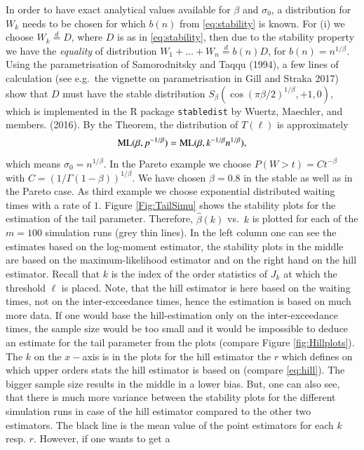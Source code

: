 \documentclass[]{elsarticle} %
\begin{document}
In order to have exact analytical values available for \(\beta\) and
\(\sigma_0\), a distribution for \(W_k\) needs to be chosen for which
\(b(n)\) from \eqref{eq:stability} is known. For (i) we choose
\(W_k \stackrel{d}{=} D\), where \(D\) is as in \eqref{eq:stability},
then due to the stability property we have the \emph{equality} of
distribution \(W_1 + \ldots + W_n \stackrel{d}{=} b(n) D\), for
\(b(n) = n^{1/\beta}\). Using the parametrisation of Samorodnitsky and
Taqqu (1994), a few lines of calculation (see e.g.~the vignette on
parametrisation in Gill and Straka 2017) show that \(D\) must have the
stable distribution \(S_\beta(\cos(\pi \beta/2)^{1/\beta}, +1, 0)\),
which is implemented in the R package \texttt{stabledist} by Wuertz,
Maechler, and members. (2016). By the Theorem, the distribution of
\(T(\ell)\) is approximately \[
{\rm ML}(\beta, p^{-1/\beta}) 
= {\rm ML}(\beta, k^{-1/\beta} n^{1/\beta}),
\] which means \(\sigma_0 = n^{1/\beta}\). In the Pareto example we
choose \(P(W>t)=Ct^{-\beta}\) with \(C=(1/\Gamma(1-\beta))^{1/\beta}\).
We have chosen \(\beta=0.8\) in the stable as well as in the Pareto
case. As third example we choose exponential distributed waiting times
with a rate of \(1\). Figure \ref{Fig:TailSimu} shows the stability
plots for the estimation of the tail parameter. Therefore,
\(\hat \beta(k)\) vs.~\(k\) is plotted for each of the \(m=100\)
simulation runs (grey thin lines). In the left column one can see the
estimates based on the log-moment estimator, the stability plots in the
middle are based on the maximum-likelihood estimator and on the right
hand on the hill estimator. Recall that \(k\) is the index of the order
statistics of \(J_k\) at which the threshold \(\ell\) is placed. Note,
that the hill estimator is here based on the waiting times, not on the
inter-exceedance times, hence the estimation is based on much more data.
If one would base the hill-estimation only on the inter-exceedance
times, the sample size would be too small and it would be impossible to
deduce an estimate for the tail parameter from the plots (compare Figure
\ref{fig:Hillplots}). The \(k\) on the \(x-\)axis is in the plots for
the hill estimator the \(r\) which defines on which upper orders stats
the hill estimator is based on (compare \eqref{eq:hill}). The bigger
sample size results in the middle in a lower bias. But, one can also
see, that there is much more variance between the stability plots for
the different simulation runs in case of the hill estimator compared to
the other two estimators. The black line is the mean value of the point
estimators for each \(k\) resp. \(r\). However, if one wants to get a
\end{document}
